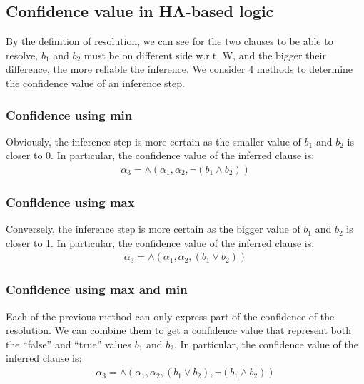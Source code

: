 \documentclass[part1.tex]{subfiles}
\begin{document}
\subsection{Confidence value in HA-based logic}
By the definition of resolution, we can see for the two clauses to be able to resolve, \(b_1\) and 
\(b_2\) must be on different side w.r.t. W, and the bigger their difference, the more reliable the 
inference. We consider 4 methods to determine the confidence value of an inference step.\\
\subsubsection{Confidence using min}
Obviously, the inference step is more certain as the smaller value of \(b_1\) and \(b_2\) is closer to 
0. In particular, the confidence value of the inferred clause is:
\begin{align*}
	{\alpha}_3 = \wedge({\alpha}_1, {\alpha}_2, \neg(b_1 \wedge b_2))
\end{align*}
\subsubsection{Confidence using max}
Conversely, the inference step is more certain as the bigger value of \(b_1\) and \(b_2\) is closer to 
1. In particular, the confidence value of the inferred clause is:
\begin{align*}
	{\alpha}_3 = \wedge({\alpha}_1, {\alpha}_2, (b_1 \vee b_2))
\end{align*}
\subsubsection{Confidence using max and min}
Each of the previous method can only express part of the confidence of the resolution. We can combine
them to get a confidence value that represent both the ``false'' and ``true'' values \(b_1\) and 
\(b_2\). In particular, the confidence value of the inferred clause is:
\begin{align*}
	{\alpha}_3 = \wedge({\alpha}_1, {\alpha}_2, (b_1 \vee b_2), \neg(b_1 \wedge b_2))
\end{align*}
\end{document}
